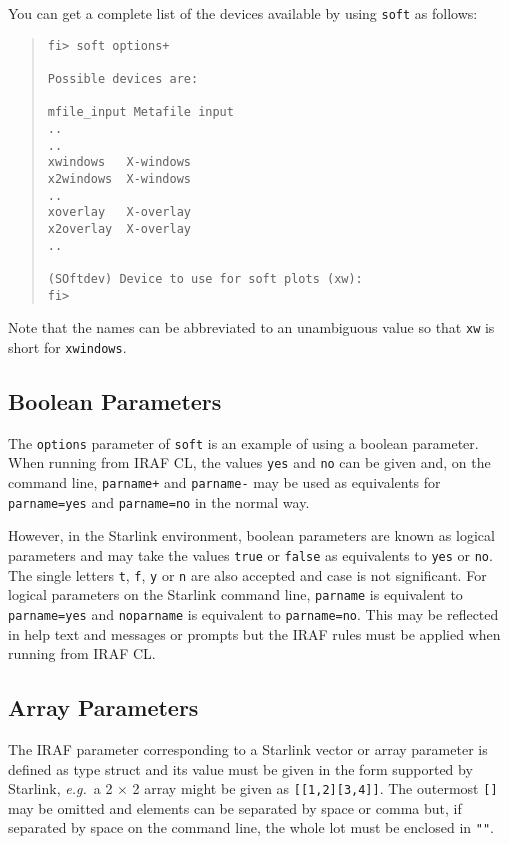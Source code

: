 \documentclass[twoside,11pt]{article}
\newcommand{\xlabel}[1]{}
\begin{document}
You can get a complete list of the devices available by using 
\texttt{soft} as follows:
\begin{quote} \begin{verbatim}
fi> soft options+

Possible devices are:

mfile_input Metafile input
..
..
xwindows   X-windows
x2windows  X-windows
..
xoverlay   X-overlay
x2overlay  X-overlay
..

(SOftdev) Device to use for soft plots (xw):
fi>
\end{verbatim} \end{quote}
Note that the names can be abbreviated to an unambiguous value so that 
\texttt{xw} is short for \texttt{xwindows}.

\subsection{\xlabel{boolean_parameters}Boolean Parameters}
The \texttt{options} parameter of \texttt{soft} is an example of using a 
boolean parameter.
When running from IRAF CL, the values \texttt{yes} and \texttt{no} can be 
given and, on the command line, \texttt{parname+} and \texttt{parname-} may be
used as equivalents for \texttt{parname=yes} and \texttt{parname=no} in the 
normal way.

However, in the Starlink environment, boolean parameters are known as logical
parameters and may take the values \texttt{true} or \texttt{false} as 
equivalents to \texttt{yes} or \texttt{no}. 
The single letters \texttt{t}, \texttt{f}, \texttt{y} or \texttt{n} are also 
accepted and case is not significant. 
For logical parameters on the Starlink command line, 
\texttt{parname} is equivalent to \texttt{parname=yes} and 
\texttt{noparname} is equivalent to \texttt{parname=no}.
This may be reflected in help text and messages or prompts but the IRAF rules
must be applied when running from IRAF CL.

\subsection{\xlabel{array_parameters}Array Parameters}
The IRAF parameter corresponding to a Starlink vector or array parameter is 
defined as type struct and its value must be given in the form supported by
Starlink, \textit{e.g.}\ a 2 $\times$ 2 array might be given as 
\texttt{[[1,2][3,4]]}.
The outermost \texttt{[]} may be omitted and elements can be
separated by space or comma but, if separated by space on the command line,
the whole lot must be enclosed in \texttt{""}.
\end{document}
